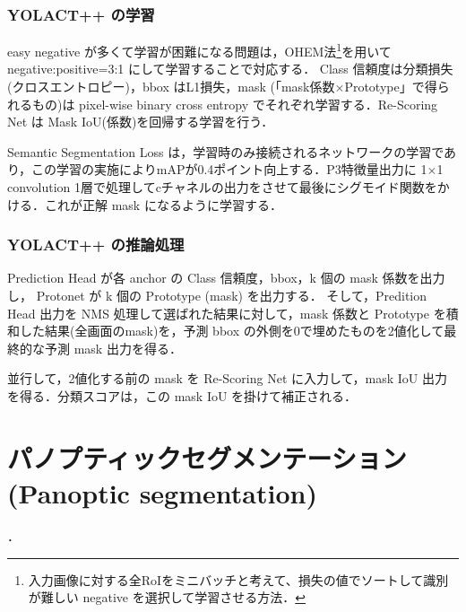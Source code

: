 \documentclass[originalpaper,fleqn]{jsaiart}     %
\begin{document}
\subsubsection{YOLACT++ の学習}
easy negative が多くて学習が困難になる問題は，OHEM法\footnote[3]{入力画像に対する全RoIをミニバッチと考えて、損失の値でソートして識別が難しい negative を選択して学習させる方法．}を用いて negative:positive=3:1 にして学習することで対応する．
Class 信頼度は分類損失(クロスエントロピー)，bbox はL1損失，mask (「mask係数×Prototype」で得られるもの)は pixel-wise binary cross entropy でそれぞれ学習する．Re-Scoring Net は Mask IoU(係数)を回帰する学習を行う．

Semantic Segmentation Loss は，学習時のみ接続されるネットワークの学習であり，この学習の実施によりmAPが0.4ポイント向上する．P3特徴量出力に 1×1 convolution 1層で処理してcチャネルの出力をさせて最後にシグモイド関数をかける．これが正解 mask になるように学習する．

\subsubsection{YOLACT++ の推論処理}
Prediction Head が各 anchor の Class 信頼度，bbox，k 個の mask 係数を出力し，
Protonet が k 個の Prototype (mask) を出力する．
そして，Predition Head 出力を NMS 処理して選ばれた結果に対して，mask 係数と Prototype を積和した結果(全画面のmask)を，予測 bbox の外側を0で埋めたものを2値化して最終的な予測 mask 出力を得る．

並行して，2値化する前の mask を Re-Scoring Net に入力して，mask IoU 出力を得る．分類スコアは，この mask IoU を掛けて補正される．
\section{パノプティックセグメンテーション(Panoptic segmentation)}
\cite{KHGRD19}．
\end{document}
